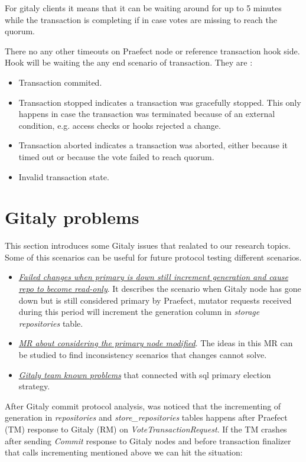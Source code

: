 \documentclass[acmlarge, screen, nonacm]{acmart}
\begin{document}
For gitaly clients it means that it can be waiting around for up to 5 minutes while the transaction 
is completing if in case votes are missing to reach the quorum.

There no any other timeouts on Praefect node or reference transaction hook side. 
Hook will be waiting the any end scenario of transaction. They are :

\begin{itemize}
\item Transaction commited.
\item Transaction stopped indicates a transaction was gracefully stopped. 
This only happens in case the transaction was terminated because of an external condition, e.g. access 
checks or hooks rejected a change.
\item Transaction aborted indicates a transaction was aborted, either because it timed out or because 
the vote failed to reach quorum.
\item Invalid transaction state.
\end{itemize}

\section{Gitaly problems}
This section introduces some Gitaly issues that realated to our research topics. Some 
of this scenarios can be useful for future protocol testing different scenarios.
\begin{itemize}
\item  \emph{\href{https://gitlab.com/gitlab-org/gitaly/-/issues/3605}{ Failed changes when primary is down still increment 
generation and cause repo to become read-only}}. It describes the scenario when Gitaly node has gone down but is still 
considered primary by Praefect, mutator requests received during this period will increment the generation column 
in \textit{storage repositories} table.
\item  \emph{\href{https://gitlab.com/gitlab-org/gitaly/-/merge_requests/3494}{ MR about considering the primary node modified}}. 
The ideas in this MR can be studied to find inconsistency scenarios that changes cannot solve.
\item  \emph{\href{https://gitlab.com/gitlab-org/gitaly/-/blob/master/doc/virtual\_storage.md\#known-problems}{Gitaly team known problems}} 
that connected with sql primary election strategy. 
\end{itemize}

After Gitaly commit protocol analysis, was noticed that the incrementing of generation in \textit{repositories}
 and \textit{store\_repositories} tables happens after Praefect (TM) response to Gitaly (RM) 
 on \textit{VoteTransactionRequest}. If the TM crashes after sending \textit{Commit} response 
 to Gitaly nodes and before transaction finalizer that calls incrementing mentioned above we can hit 
 the situation:
	
\end{document}
